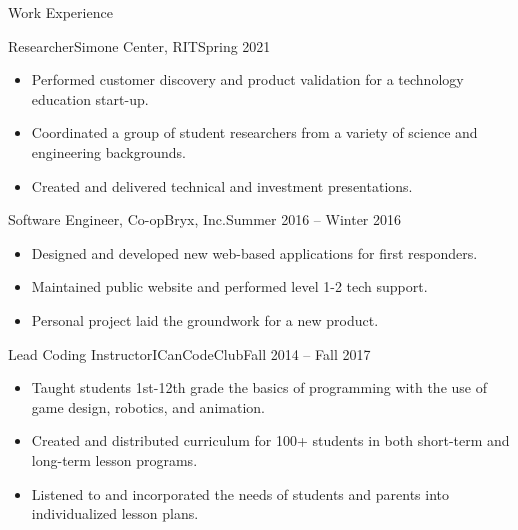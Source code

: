 \documentclass[]{mcdowellcv}
\begin{document}
	\makeheader
	
	\begin{cvsection}{Work Experience}
		\begin{cvsubsection}{Researcher}{Simone Center, RIT}{Spring 2021}
				
			\begin{itemize}
				\item Performed customer discovery and product validation for a technology education start-up.
				\item Coordinated a group of student researchers from a variety of science and engineering backgrounds.
				\item Created and delivered technical and investment presentations.
			\end{itemize}
		\end{cvsubsection}
		
		\begin{cvsubsection}{Software Engineer, Co-op}{Bryx, Inc.}{Summer 2016 -- Winter 2016}	
			\begin{itemize}
				\item Designed and developed new web-based applications for first responders.
				\item Maintained public website and performed level 1-2 tech support.
				\item Personal project laid the groundwork for a new product.
			\end{itemize}
		\end{cvsubsection}
		
		\begin{cvsubsection}{Lead Coding Instructor}{ICanCodeClub}{Fall 2014 -- Fall 2017}		
			\begin{itemize}
				\item Taught students 1st-12th grade the basics of programming with the use of game design, robotics, and animation.
				\item Created and distributed curriculum for 100+ students in both short-term and long-term lesson programs.
				\item Listened to and incorporated the needs of students and parents into individualized lesson plans.
			\end{itemize}
		\end{cvsubsection}	
	\end{cvsection}
	
\end{document}
